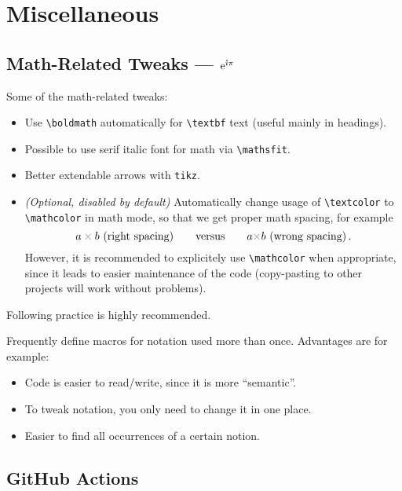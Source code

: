 \section{Miscellaneous}%
\label{sec:Miscellaneous}

\subsection{Math-Related Tweaks --- \texorpdfstring{\(\E^{\I\pi}\)}{exp(iπ)}}%
\label{sub:Math Macros}

Some of the math-related tweaks:
\begin{itemize}
    \item Use \verb|\boldmath| automatically for \verb|\textbf| text (useful mainly in headings).
    \item Possible to use serif italic font for math via \verb|\mathsfit|.
    \item Better extendable arrows with \texttt{tikz}.
    \item \emph{(Optional, disabled by default)} Automatically change usage of \verb|\textcolor| to \verb|\mathcolor| in math mode, so that we get proper math spacing, for example
          \[ a \mathcolor{gray}{\times} b \text{ (right spacing)} \qquad\text{versus}\qquad a \textcolor{gray}{\times} b \text{ (wrong spacing)}\eqend \]
          However, it is recommended to explicitely use \verb|\mathcolor| when appropriate, since it leads to easier maintenance of the code (copy-pasting to other projects will work without problems).
\end{itemize}

\vspace{1ex}
Following practice is highly recommended.
\begin{tip}
    Frequently define macros for notation used more than once. Advantages are for example:
    \begin{itemize}
        \item Code is easier to read/write, since it is more \enquote{semantic}.
        \item To tweak notation, you only need to change it in one place.
        \item Easier to find all occurrences of a certain notion. \qedhere
    \end{itemize}
\end{tip}

\subsection{GitHub Actions}%
\label{sub:GitHub Actions}


